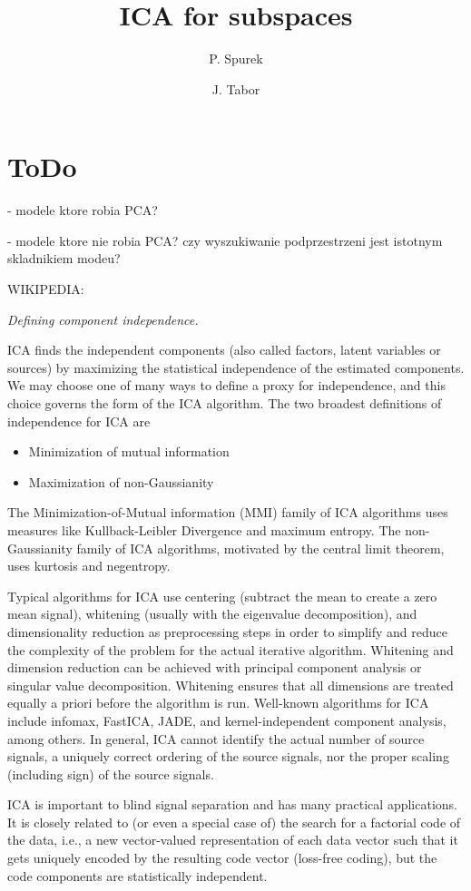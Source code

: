 \documentclass[12pt]{article}
\title{ICA for subspaces}
\author{P. Spurek \and J. Tabor}
\date{}
\theoremstyle{definition}
\begin{document}
\maketitle


\section{ToDo}

- modele ktore robia PCA?

- modele ktore nie robia PCA? czy wyszukiwanie podprzestrzeni jest istotnym skladnikiem modeu?

WIKIPEDIA:
{\em 
Defining component independence.

ICA finds the independent components (also called factors, latent variables or sources) by maximizing the statistical independence of the estimated components. We may choose one of many ways to define a proxy for independence, and this choice governs the form of the ICA algorithm. The two broadest definitions of independence for ICA are
\begin{itemize}
\item Minimization of mutual information
\item Maximization of non-Gaussianity
\end{itemize}

The Minimization-of-Mutual information (MMI) family of ICA algorithms uses measures like Kullback-Leibler Divergence and maximum entropy. The non-Gaussianity family of ICA algorithms, motivated by the central limit theorem, uses kurtosis and negentropy.

Typical algorithms for ICA use centering (subtract the mean to create a zero mean signal), whitening (usually with the eigenvalue decomposition), and dimensionality reduction as preprocessing steps in order to simplify and reduce the complexity of the problem for the actual iterative algorithm. Whitening and dimension reduction can be achieved with principal component analysis or singular value decomposition. Whitening ensures that all dimensions are treated equally a priori before the algorithm is run. Well-known algorithms for ICA include infomax, FastICA, JADE, and kernel-independent component analysis, among others. In general, ICA cannot identify the actual number of source signals, a uniquely correct ordering of the source signals, nor the proper scaling (including sign) of the source signals.

ICA is important to blind signal separation and has many practical applications. It is closely related to (or even a special case of) the search for a factorial code of the data, i.e., a new vector-valued representation of each data vector such that it gets uniquely encoded by the resulting code vector (loss-free coding), but the code components are statistically independent.}
\end{document}

